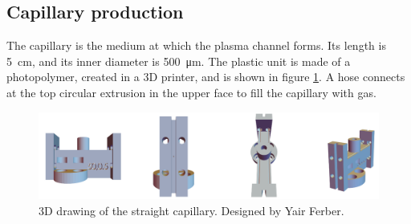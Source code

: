 \documentclass[../main.tex]{subfiles}
\begin{document}
\subsection{Capillary production}
The capillary is the medium at which the plasma channel forms. Its length is \SI{5}{\cm}, and its inner diameter is \SI{500}{\um}. The plastic unit is made of a photopolymer, created in a 3D printer, and is shown in figure \ref{fig:onecapillaryCAD}. A hose connects at the top circular extrusion in the upper face to fill the capillary with gas.
\begin{figure}[b]
    \centering
    \includegraphics[width=\textwidth]{figures/cad/onecapillary_cad.PNG}
    \caption{3D drawing of the straight capillary.  Designed by Yair Ferber.}
    \label{fig:onecapillaryCAD}
\end{figure}
\end{document}
